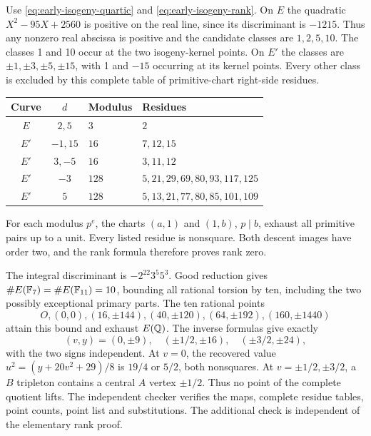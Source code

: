 Use \eqref{eq:early-isogeny-quartic} and
\eqref{eq:early-isogeny-rank}. On $E$ the quadratic
$X^2-95X+2560$ is positive on the real line, since its discriminant
is $-1215$. Thus any nonzero real abscissa is positive and the
candidate classes are $1,2,5,10$. The classes 1 and 10 occur at
the two isogeny-kernel points. On $E'$ the classes are
$\pm1,\pm3,\pm5,\pm15$, with 1 and $-15$ occurring at its
kernel points. Every other class is excluded by this complete table
of primitive-chart right-side residues.
\begin{center}
\begin{tabular}{ccll}
\toprule
Curve & $d$ & Modulus & Residues\\
\midrule
$E$ & $2,5$ & $3$ & $2$\\
$E'$ & $-1,15$ & $16$ & $7,12,15$\\
$E'$ & $3,-5$ & $16$ & $3,11,12$\\
$E'$ & $-3$ & $128$ & $5,21,29,69,80,93,117,125$\\
$E'$ & $5$ & $128$ & $5,13,21,77,80,85,101,109$\\
\bottomrule
\end{tabular}
\end{center}
For each modulus $p^e$, the charts $(a,1)$ and $(1,b)$, $p\mid b$,
exhaust all primitive pairs up to a unit. Every listed residue is
nonsquare. Both descent images have order two, and the rank formula
therefore proves rank zero.

The integral discriminant is $-2^{22}3^5 5^3$. Good reduction gives
$\#E(\mathbb F_7)=\#E(\mathbb F_{11})=10$, bounding all rational
torsion by ten, including the two possibly exceptional primary parts.
The ten rational points
\[
 O,(0,0),(16,\pm144),(40,\pm120),(64,\pm192),(160,\pm1440)
\]
attain this bound and exhaust $E(\mathbb Q)$. The inverse formulas
give exactly
\[
 (v,y)=(0,\pm9),\quad(\pm1/2,\pm16),\quad(\pm3/2,\pm24),
\]
with the two signs independent. At $v=0$, the recovered value
$u^2=(y+20v^2+29)/8$ is $19/4$ or $5/2$, both nonsquares.
At $v=\pm1/2,\pm3/2$, a $B$ tripleton contains a central $A$
vertex $\pm1/2$. Thus no point of the complete quotient lifts.
The independent checker  verifies the
maps, complete residue tables, point counts, point list and substitutions.
The additional check  is independent of
the elementary rank proof.

